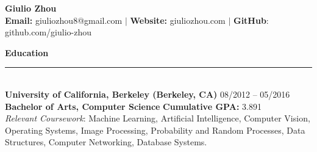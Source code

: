 \documentclass{article}
\begin{document}
\newcommand{\HRule}{\rule{\linewidth}{0.2mm}}


\begin{center}
\textbf{{\LARGE Giulio Zhou}} \\ 
\textbf{\fontsize{11}{13.2} Email:} giuliozhou8@gmail.com  $|$ \textbf{Website:} giuliozhou.com $|$ \textbf{GitHub}: github.com/giulio-zhou\\[2mm]
\end{center}


\normalsize
\noindent
\textbf{{\Large Education}}\\[-2mm]
\HRule\\
\textbf{University of California, Berkeley (Berkeley, CA)}
\hfill 08/2012 -- 05/2016 \\
\indent
\textbf{Bachelor of Arts, Computer Science}  
\hfill{\textbf{Cumulative GPA: }3.891}\\
\textit{Relevant Coursework}: Machine Learning, Artificial Intelligence, Computer Vision, Operating Systems, Image Processing, Probability and Random Processes, Data Structures, Computer Networking, Database Systems.
\\
\end{document}
